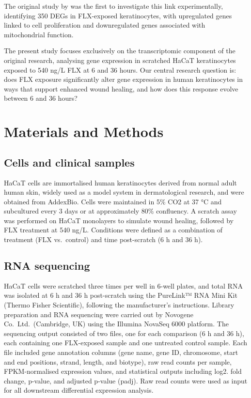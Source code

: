 The original study by \citep{rodriguez:2024} was the first to
investigate this link experimentally, identifying 350 DEGs in
FLX-exposed keratinocytes, with upregulated genes linked to cell
proliferation and downregulated genes associated with mitochondrial
function.

The present study focuses exclusively on the transcriptomic component of
the original research, analysing gene expression in scratched HaCaT
keratinocytes exposed to 540 ng/L FLX at 6 and 36 hours. Our central
research question is: does FLX exposure significantly alter gene
expression in human keratinocytes in ways that support enhanced wound
healing, and how does this response evolve between 6 and 36 hours?

\section{Materials and Methods}\label{materials-and-methods}

\subsection{Cells and clinical
samples}\label{cells-and-clinical-samples}

HaCaT cells are immortalised human keratinocytes derived from normal
adult human skin, widely used as a model system in dermatological
research, and were obtained from AddexBio. Cells were maintained in 5\%
CO2 at 37 °C and subcultured every 3 days or at approximately 80\%
confluency. A scratch assay was performed on HaCaT monolayers to
simulate wound healing, followed by FLX treatment at 540 ng/L.
Conditions were defined as a combination of treatment (FLX vs.~control)
and time post-scratch (6 h and 36 h).

\subsection{RNA sequencing}\label{rna-sequencing}

HaCaT cells were scratched three times per well in 6-well plates, and
total RNA was isolated at 6 h and 36 h post-scratch using the PureLink™
RNA Mini Kit (Thermo Fisher Scientific), following the manufacturer's
instructions. Library preparation and RNA sequencing were carried out by
Novogene Co.~Ltd.~(Cambridge, UK) using the Illumina NovaSeq 6000
platform. The sequencing output consisted of two files, one for each
comparison (6 h and 36 h), each containing one FLX-exposed sample and
one untreated control sample. Each file included gene annotation columns
(gene name, gene ID, chromosome, start and end positions, strand,
length, and biotype), raw read counts per sample, FPKM-normalised
expression values, and statistical outputs including log2. fold change,
p-value, and adjusted p-value (padj). Raw read counts were used as input
for all downstream differential expression analysis.

